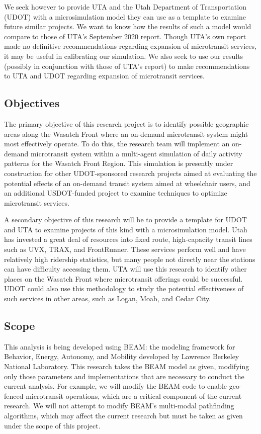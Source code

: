\documentclass[
]{article}
\begin{document}
We seek however to provide UTA and the Utah Department of Transportation (UDOT) with a microsimulation model they can use as a template to examine future similar projects. We want to know how the results of such a model would compare to those of UTA's September 2020 report. Though UTA's own report made no definitive recommendations regarding expansion of microtransit services, it may be useful in calibrating our simulation. We also seek to use our results (possibly in conjunction with those of UTA's report) to make recommendations to UTA and UDOT regarding expansion of microtransit services.

\hypertarget{objectives}{%
\subsection{Objectives}\label{objectives}}

The primary objective of this research project is to identify possible geographic areas along the Wasatch Front where an on-demand microtransit system might most effectively operate. To do this, the research team will implement an on-demand microtransit system within a multi-agent simulation of daily activity patterns for the Wasatch Front Region. This simulation is presently under construction for other UDOT-sponsored research projects aimed at evaluating the potential effects of an on-demand transit system aimed at wheelchair users, and an additional USDOT-funded project to examine techniques to optimize microtransit services.

A secondary objective of this research will be to provide a template for UDOT and UTA to examine projects of this kind with a microsimulation model. Utah has invested a great deal of resources into fixed route, high-capacity transit lines such as UVX, TRAX, and FrontRunner. These services perform well and have relatively high ridership statistics, but many people not directly near the stations can have difficulty accessing them. UTA will use this research to identify other places on the Wasatch Front where microtransit offerings could be successful. UDOT could also use this methodology to study the potential effectiveness of such services in other areas, such as Logan, Moab, and Cedar City.

\hypertarget{scope}{%
\subsection{Scope}\label{scope}}

This analysis is being developed using BEAM: the modeling framework for Behavior, Energy, Autonomy, and Mobility developed by Lawrence Berkeley National Laboratory. This research takes the BEAM model as given, modifying only those parameters and implementations that are necessary to conduct the current analysis. For example, we will modify the BEAM code to enable geo-fenced microtransit operations, which are a critical component of the current research. We will not attempt to modify BEAM's multi-modal pathfinding algorithms, which may affect the current research but must be taken as given under the scope of this project.
\end{document}
